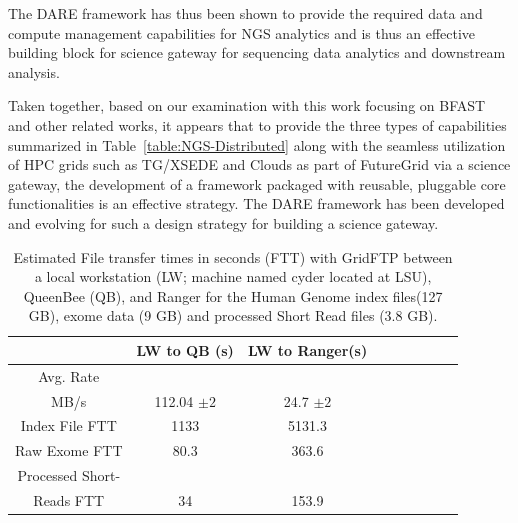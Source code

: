 \documentclass[]{svjour3}
\begin{document}
The DARE framework has thus been shown to provide the required data
and compute management capabilities for NGS analytics and is thus an
effective building block for science gateway for sequencing data
analytics and downstream analysis.

Taken together, based on our examination with this work focusing on BFAST and other related works, it appears that to provide the three types of capabilities summarized in Table~\ref{table:NGS-Distributed} along with the seamless utilization of HPC grids such as TG/XSEDE and Clouds as part of FutureGrid\cite{dare-ecmls11} via a science gateway, the development of a framework packaged with reusable, pluggable core functionalities is an effective strategy.  The DARE framework has been developed and evolving for such a design strategy for building a science gateway.     

 \begin{table}
\centering
 \small
 \begin{tabular}{|c|c|c|c|c|c|c|c|c|} 
 \hline  
 	          & LW to QB (s)  & LW to Ranger(s) \\
 \hline                       
Avg. Rate && \\
MB/s & 112.04 $\pm 2$ &	    24.7 $\pm 2$  \\
 \hline                       
Index File	FTT & 1133  &	    5131.3      \\        
 \hline                       
Raw 	 Exome FTT&80.3 & 363.6\\                  
 \hline                       
Processed Short-&    & \\
Reads FTT&34&153.9  \\
 \hline                       
\end{tabular}
\caption{Estimated File transfer times in seconds (FTT) with GridFTP
  between a local workstation (LW; machine named cyder located at
  LSU), QueenBee (QB), and Ranger for the Human Genome index files(127
  GB), exome data (9 GB) and processed Short Read files (3.8 GB).}

 \label{table:NGS-Distributed-file} 
\end{table}
\end{document}
